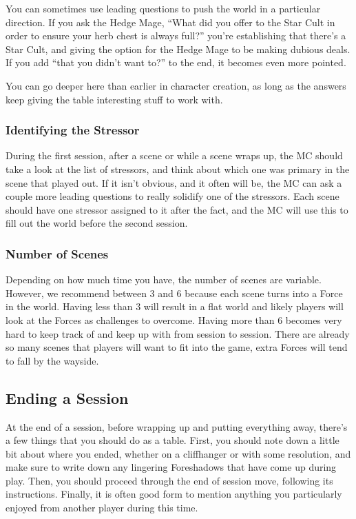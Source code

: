 \documentclass[
]{article}
\begin{document}
You can sometimes use leading questions to push the world in a
particular direction. If you ask the Hedge Mage, ``What did you offer to
the Star Cult in order to ensure your herb chest is always full?''
you're establishing that there's a Star Cult, and giving the option for
the Hedge Mage to be making dubious deals. If you add ``that you didn't
want to?'' to the end, it becomes even more pointed.

You can go deeper here than earlier in character creation, as long as
the answers keep giving the table interesting stuff to work with.

\hypertarget{identifying-the-stressor}{%
\subsubsection{Identifying the
Stressor}\label{identifying-the-stressor}}

During the first session, after a scene or while a scene wraps up, the
MC should take a look at the list of stressors, and think about which
one was primary in the scene that played out. If it isn't obvious, and
it often will be, the MC can ask a couple more leading questions to
really solidify one of the stressors. Each scene should have one
stressor assigned to it after the fact, and the MC will use this to fill
out the world before the second session.

\hypertarget{number-of-scenes}{%
\subsubsection{Number of Scenes}\label{number-of-scenes}}

Depending on how much time you have, the number of scenes are variable.
However, we recommend between 3 and 6 because each scene turns into a
Force in the world. Having less than 3 will result in a flat world and
likely players will look at the Forces as challenges to overcome. Having
more than 6 becomes very hard to keep track of and keep up with from
session to session. There are already so many scenes that players will
want to fit into the game, extra Forces will tend to fall by the
wayside.

\hypertarget{ending-a-session-1}{%
\subsection{Ending a Session}\label{ending-a-session-1}}

At the end of a session, before wrapping up and putting everything away,
there's a few things that you should do as a table. First, you should
note down a little bit about where you ended, whether on a cliffhanger
or with some resolution, and make sure to write down any lingering
Foreshadows that have come up during play. Then, you should proceed
through the end of session move, following its instructions. Finally, it
is often good form to mention anything you particularly enjoyed from
another player during this time.
\end{document}
